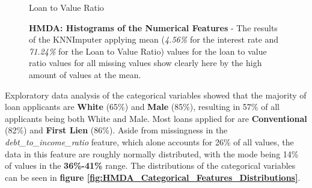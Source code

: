 \begin{figure}[!htbp]
\begin{minipage}{0.5\textwidth}
        \small
        Loan to Value Ratio
    \end{minipage}    
    \caption[HMDA: Histograms of the Numerical Features]{\textbf{HMDA: Histograms of the Numerical Features} - The results of the KNNImputer applying mean (\textit{4.56\%} for the interest rate and \textit{71.24\%} for the Loan to Value Ratio) values for the loan to value ratio values for all missing values show clearly here by the high amount of values at the mean.}
    \label{fig:CHXX_Numerical_Distributions_2}
\end{figure}

Exploratory data analysis of the categorical variables showed that the majority of loan applicants are \textbf{White} (65\%) and \textbf{Male} (85\%), resulting in 57\% of all applicants being both White and Male.
Most loans applied for are \textbf{Conventional} (82\%) and \textbf{First Lien} (86\%).
Aside from missingness in the \textit{debt\_to\_income\_ratio} feature, which alone accounts for 26\% of all values, the data in this feature are roughly normally distributed, with the mode being 14\% of values in the \textbf{36\%-41\%} range. 
The distributions of the categorical variables can be seen in \textbf{figure \ref{fig:HMDA_Categorical_Features_Distributions}}.

